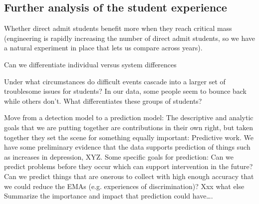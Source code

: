 \subsection{Further analysis of the student experience}

Whether direct admit students benefit more when they reach critical mass (engineering is rapidly increasing the number of direct admit students, so we have a natural experiment in place that lets us compare across years).

Can we differentiate individual versus system differences

Under what circumstances do difficult events cascade into a larger set of troublesome issues for students? In our data, some people seem to bounce back while others don’t. What differentiates these groups of students?

Move from a detection model to a prediction model: The descriptive and analytic goals that we are putting together are contributions in their own right, but taken together they set the scene for something equally important: Predictive work. We have some preliminary evidence that the data supports prediction of things such as increases in depression, XYZ. Some specific goals for prediction:
Can we predict problems before they occur which can support intervention in the future?
Can we predict things that are onerous to collect with high enough accuracy that we could reduce the EMAs (e.g. experiences of discrimination)?
Xxx what else 
Summarize the importance and impact that prediction could have….


